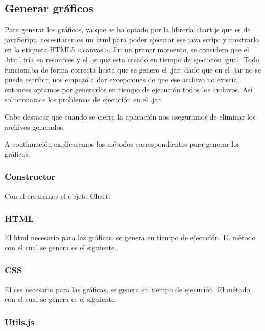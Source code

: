 \subsection{Generar gráficos}\label{generar-graficos}

Para generar los gráficos, ya que se ha optado por la librería chart.js que es de javaScript, necesitaremos un html para poder ejecutar ese java script y mostrarlo en la etiqueta HTML5 <canvas>. En un primer momento, se considero que el .html iría en resources y el .js que esta creado en tiempo de ejecución igual. Todo funcionaba de forma correcta hasta que se genero el .jar, dado que en el .jar no se puede escribir, nos empezó a dar excepciones de que ese archivo no existía, entonces optamos por generarlos en tiempo de ejecución todos los archivos. Así solucionamos los problemas de ejecución en el .jar.

Cabe destacar que cuando se cierra la aplicación nos aseguramos de eliminar los archivos generados.

A continuación explicaremos los métodos correspondientes para generar los gráficos.

\subsubsection{Constructor}\label{constructor}

Con el crearemos el objeto Chart.


\subsubsection{HTML}\label{html}

El html necesario para las gráficas, se genera en tiempo de ejecución. El método con el cual se genera es el siguiente.


\subsubsection{CSS}\label{css}

El css necesario para las gráficas, se genera en tiempo de ejecución. El método con el cual se genera es el siguiente.


\subsubsection{Utils.js}\label{utils}


